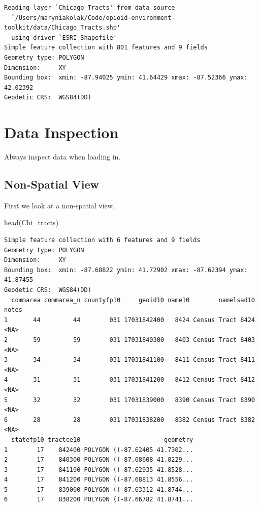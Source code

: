 \documentclass[
  letterpaper,
  DIV=11,
  numbers=noendperiod]{scrreprt}
\newenvironment{Shaded}{\begin{snugshade}}{\end{snugshade}}
\newcommand{\FunctionTok}[1]{\textcolor[rgb]{0.28,0.35,0.67}{#1}}
\newcommand{\NormalTok}[1]{\textcolor[rgb]{0.00,0.23,0.31}{#1}}
\begin{document}
\begin{verbatim}
Reading layer `Chicago_Tracts' from data source 
  `/Users/maryniakolak/Code/opioid-environment-toolkit/data/Chicago_Tracts.shp' 
  using driver `ESRI Shapefile'
Simple feature collection with 801 features and 9 fields
Geometry type: POLYGON
Dimension:     XY
Bounding box:  xmin: -87.94025 ymin: 41.64429 xmax: -87.52366 ymax: 42.02392
Geodetic CRS:  WGS84(DD)
\end{verbatim}

\section{Data Inspection}\label{data-inspection}

Always inspect data when loading in.

\subsection{Non-Spatial View}\label{non-spatial-view}

First we look at a non-spatial view.

\begin{Shaded}
\begin{Highlighting}[]
\FunctionTok{head}\NormalTok{(Chi\_tracts)}
\end{Highlighting}
\end{Shaded}

\begin{verbatim}
Simple feature collection with 6 features and 9 fields
Geometry type: POLYGON
Dimension:     XY
Bounding box:  xmin: -87.68822 ymin: 41.72902 xmax: -87.62394 ymax: 41.87455
Geodetic CRS:  WGS84(DD)
  commarea commarea_n countyfp10     geoid10 name10        namelsad10 notes
1       44         44        031 17031842400   8424 Census Tract 8424  <NA>
2       59         59        031 17031840300   8403 Census Tract 8403  <NA>
3       34         34        031 17031841100   8411 Census Tract 8411  <NA>
4       31         31        031 17031841200   8412 Census Tract 8412  <NA>
5       32         32        031 17031839000   8390 Census Tract 8390  <NA>
6       28         28        031 17031838200   8382 Census Tract 8382  <NA>
  statefp10 tractce10                       geometry
1        17    842400 POLYGON ((-87.62405 41.7302...
2        17    840300 POLYGON ((-87.68608 41.8229...
3        17    841100 POLYGON ((-87.62935 41.8528...
4        17    841200 POLYGON ((-87.68813 41.8556...
5        17    839000 POLYGON ((-87.63312 41.8744...
6        17    838200 POLYGON ((-87.66782 41.8741...
\end{verbatim}
\end{document}
